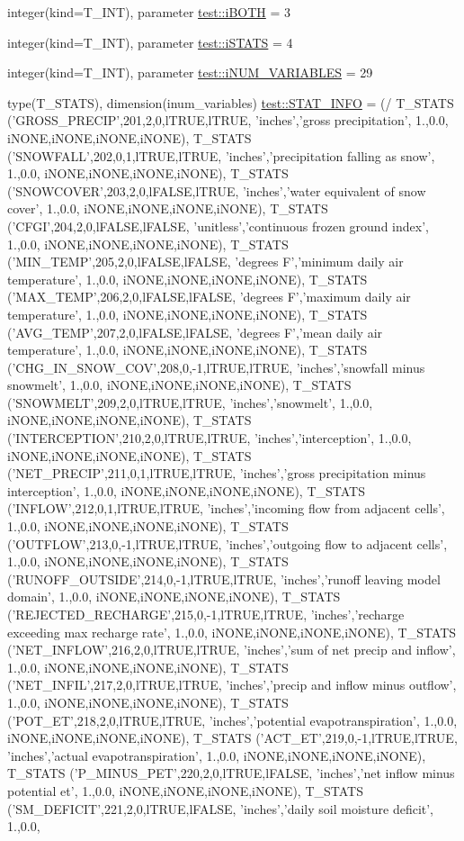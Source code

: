 \begin{DoxyCompactItemize}
\item 
integer(kind=T\_\-INT), parameter \hyperlink{namespacetest_abd0173600806ba49317705aafe0c2bf3}{test::iBOTH} = 3
\item 
integer(kind=T\_\-INT), parameter \hyperlink{namespacetest_a4ee9e6e104ab7138d29b46b35a43f499}{test::iSTATS} = 4
\item 
integer(kind=T\_\-INT), parameter \hyperlink{namespacetest_ae9174c7998b12348b71aa854ca83add7}{test::iNUM\_\-VARIABLES} = 29
\item 
type(T\_\-STATS), dimension(inum\_\-variables) \hyperlink{namespacetest_a66691525d314829771051bdadd26160f}{test::STAT\_\-INFO} = (/ T\_\-STATS ('GROSS\_\-PRECIP',201,2,0,lTRUE,lTRUE, 'inches','gross precipitation', 1.,0.0, iNONE,iNONE,iNONE,iNONE), T\_\-STATS ('SNOWFALL',202,0,1,lTRUE,lTRUE, 'inches','precipitation falling as snow', 1.,0.0, iNONE,iNONE,iNONE,iNONE), T\_\-STATS ('SNOWCOVER',203,2,0,lFALSE,lTRUE, 'inches','water equivalent of snow cover', 1.,0.0, iNONE,iNONE,iNONE,iNONE), T\_\-STATS ('CFGI',204,2,0,lFALSE,lFALSE, 'unitless','continuous frozen ground index', 1.,0.0, iNONE,iNONE,iNONE,iNONE), T\_\-STATS ('MIN\_\-TEMP',205,2,0,lFALSE,lFALSE, 'degrees F','minimum daily air temperature', 1.,0.0, iNONE,iNONE,iNONE,iNONE), T\_\-STATS ('MAX\_\-TEMP',206,2,0,lFALSE,lFALSE, 'degrees F','maximum daily air temperature', 1.,0.0, iNONE,iNONE,iNONE,iNONE), T\_\-STATS ('AVG\_\-TEMP',207,2,0,lFALSE,lFALSE, 'degrees F','mean daily air temperature', 1.,0.0, iNONE,iNONE,iNONE,iNONE), T\_\-STATS ('CHG\_\-IN\_\-SNOW\_\-COV',208,0,-\/1,lTRUE,lTRUE, 'inches','snowfall minus snowmelt', 1.,0.0, iNONE,iNONE,iNONE,iNONE), T\_\-STATS ('SNOWMELT',209,2,0,lTRUE,lTRUE, 'inches','snowmelt', 1.,0.0, iNONE,iNONE,iNONE,iNONE), T\_\-STATS ('INTERCEPTION',210,2,0,lTRUE,lTRUE, 'inches','interception', 1.,0.0, iNONE,iNONE,iNONE,iNONE), T\_\-STATS ('NET\_\-PRECIP',211,0,1,lTRUE,lTRUE, 'inches','gross precipitation minus interception', 1.,0.0, iNONE,iNONE,iNONE,iNONE), T\_\-STATS ('INFLOW',212,0,1,lTRUE,lTRUE, 'inches','incoming flow from adjacent cells', 1.,0.0, iNONE,iNONE,iNONE,iNONE), T\_\-STATS ('OUTFLOW',213,0,-\/1,lTRUE,lTRUE, 'inches','outgoing flow to adjacent cells', 1.,0.0, iNONE,iNONE,iNONE,iNONE), T\_\-STATS ('RUNOFF\_\-OUTSIDE',214,0,-\/1,lTRUE,lTRUE, 'inches','runoff leaving model domain', 1.,0.0, iNONE,iNONE,iNONE,iNONE), T\_\-STATS ('REJECTED\_\-RECHARGE',215,0,-\/1,lTRUE,lTRUE, 'inches','recharge exceeding max recharge rate', 1.,0.0, iNONE,iNONE,iNONE,iNONE), T\_\-STATS ('NET\_\-INFLOW',216,2,0,lTRUE,lTRUE, 'inches','sum of net precip and inflow', 1.,0.0, iNONE,iNONE,iNONE,iNONE), T\_\-STATS ('NET\_\-INFIL',217,2,0,lTRUE,lTRUE, 'inches','precip and inflow minus outflow', 1.,0.0, iNONE,iNONE,iNONE,iNONE), T\_\-STATS ('POT\_\-ET',218,2,0,lTRUE,lTRUE, 'inches','potential evapotranspiration', 1.,0.0, iNONE,iNONE,iNONE,iNONE), T\_\-STATS ('ACT\_\-ET',219,0,-\/1,lTRUE,lTRUE, 'inches','actual evapotranspiration', 1.,0.0, iNONE,iNONE,iNONE,iNONE), T\_\-STATS ('P\_\-MINUS\_\-PET',220,2,0,lTRUE,lFALSE, 'inches','net inflow minus potential et', 1.,0.0, iNONE,iNONE,iNONE,iNONE), T\_\-STATS ('SM\_\-DEFICIT',221,2,0,lTRUE,lFALSE, 'inches','daily soil moisture deficit', 1.,0.0, 
\end{DoxyCompactItemize}
